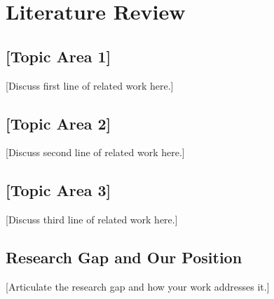 
\chapter{Literature Review}
\label{ch:literature_review}


\section{[Topic Area 1]}
\label{sec:ch2:topic1}

[Discuss first line of related work here.]

\section{[Topic Area 2]}
\label{sec:ch2:topic2}

[Discuss second line of related work here.]

\section{[Topic Area 3]}
\label{sec:ch2:topic3}

[Discuss third line of related work here.]

\section{Research Gap and Our Position}
\label{sec:ch2:gap}


[Articulate the research gap and how your work addresses it.]
